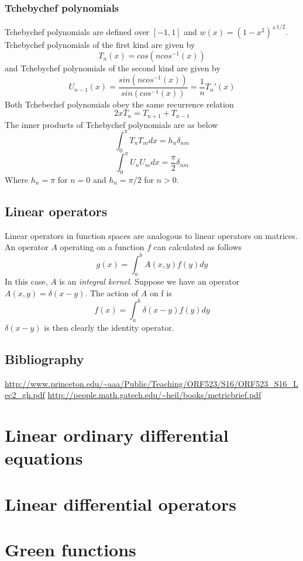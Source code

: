 \documentclass[]{article}
\begin{document}
\subsubsection{Tchebychef polynomials}
Tchebychef polynomials are defined over $[-1, 1]$ and $w(x) = (1-x^{2})^{\pm 1/2}$. Tchebychef polynomials of the first kind are given by
\begin{equation} T_{n}(x) = cos(ncos^{-1}(x))  \end{equation}
and Tchebychef polynomials of the second kind are given by
\begin{equation} U_{n-1}(x) = \frac{sin(ncos^{-1}(x))}{sin(cos^{-1}(x))} = \frac{1}{n}T_{n}'(x) \end{equation}
Both Tchebechef polynomials obey the same recurrence relation
\begin{equation} 2xT_{n} = T_{n+1} + T_{n-1} \end{equation}
The inner products of Tchebychef polynomials are as below
\begin{equation} \int_{0}^{\pi} T_{n}T_{m}dx = h_{n}\delta_{nm} \end{equation}
\begin{equation} \int_{0}^{\pi} U_{n}U_{m}dx = \frac{\pi}{2}\delta_{nm} \end{equation}
Where $h_{n}=\pi$ for $n=0$ and $h_{n}=\pi/2$ for $n>0$.
\subsection{Linear operators}
Linear operators in function spaces are analogous to linear operators on matrices.
\newline
\newline
An operator $A$ operating on a function $f$ can calculated as follows
\begin{equation} g(x) = \int_{a}^{b}A(x,y)f(y)dy \end{equation}
In this case, $A$ is an \textit{integral kernel}.
\newline
\newline
Suppose we have an operator $A(x,y) = \delta(x-y)$. The action of $A$ on f is
\begin{equation} f(x) = \int_{a}^{b} \delta(x-y)f(y)dy \end{equation}
$\delta(x-y)$ is then clearly the identity operator.

\subsection{Bibliography}
 \url{http://www.princeton.edu/~aaa/Public/Teaching/ORF523/S16/ORF523_S16_Lec2_gh.pdf}
\newline
\url{http://people.math.gatech.edu/~heil/books/metricbrief.pdf}
\newpage
\section{Linear ordinary differential equations}


\newpage
\section{Linear differential operators}


\newpage
\section{Green functions}
\end{document}
